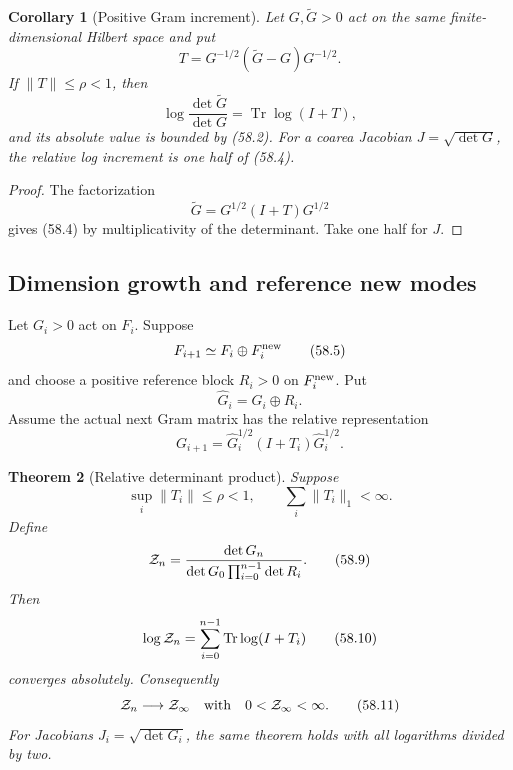 \documentclass[11pt]{article}
\newtheorem{theorem}{Theorem}[section]
\newtheorem{corollary}[theorem]{Corollary}
\begin{document}
\begin{corollary}[Positive Gram increment]
\label{cor:v11v58-gram}
Let \(G,\widetilde G>0\) act on the same finite-dimensional Hilbert
space and put
\[
                 T=G^{-1/2}(\widetilde G-G)G^{-1/2}.          \tag{58.3}
\]
If \(\lVert T\rVert\le\rho<1\), then
\[
 \log\frac{\det\widetilde G}{\det G}
                   =\operatorname{Tr}\log(I+T),               \tag{58.4}
\]
and its absolute value is bounded by (58.2).  For a coarea Jacobian
\(J=\sqrt{\det G}\), the relative log increment is one half of
(58.4).
\end{corollary}

\begin{proof}
The factorization
\[
                 \widetilde G=G^{1/2}(I+T)G^{1/2}
\]
gives (58.4) by multiplicativity of the determinant.  Take one half
for \(J\).
\end{proof}

\subsection{Dimension growth and reference new modes}

Let \(G_i>0\) act on \(F_i\).  Suppose
\[
                         F_{i+1}\simeq F_i\oplus F_i^{\rm new} \tag{58.5}
\]
and choose a positive reference block \(R_i>0\) on
\(F_i^{\rm new}\).  Put
\[
                         \widehat G_i=G_i\oplus R_i.           \tag{58.6}
\]
Assume the actual next Gram matrix has the relative representation
\[
            G_{i+1}=\widehat G_i^{1/2}(I+T_i)
                                  \widehat G_i^{1/2}.          \tag{58.7}
\]

\begin{theorem}[Relative determinant product]
\label{thm:v11v58-product}
Suppose
\[
             \sup_i\lVert T_i\rVert\le\rho<1,\qquad
             \sum_i\lVert T_i\rVert_1<\infty.                 \tag{58.8}
\]
Define
\[
 {\cal Z}_n
 =\frac{\det G_n}
        {\det G_0\prod_{i=0}^{n-1}\det R_i}.                  \tag{58.9}
\]
Then
\[
             \log{\cal Z}_n
               =\sum_{i=0}^{n-1}\operatorname{Tr}\log(I+T_i) \tag{58.10}
\]
converges absolutely.  Consequently
\[
                         {\cal Z}_n\longrightarrow{\cal Z}_\infty
                         \quad\text{with}\quad
                         0<{\cal Z}_\infty<\infty.            \tag{58.11}
\]
For Jacobians \(J_i=\sqrt{\det G_i}\), the same theorem holds with
all logarithms divided by two.
\end{theorem}
\end{document}
